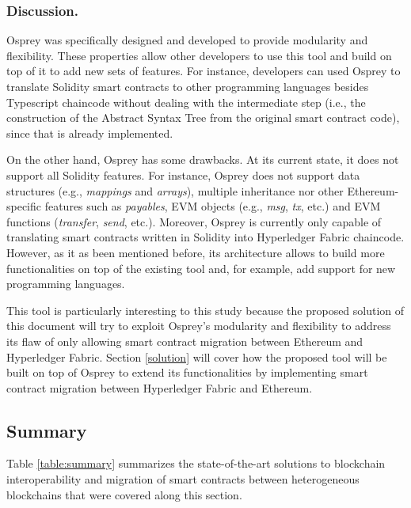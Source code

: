 \documentclass[runningheads]{llncs}
\begin{document}

\subsubsection{Discussion.}
Osprey was specifically designed and developed to provide modularity and flexibility. These properties allow other developers to use this tool and build on top of it to add new sets of features. For instance, developers can used Osprey to translate Solidity smart contracts to other programming languages besides Typescript chaincode without dealing with the intermediate step (i.e., the construction of the Abstract Syntax Tree from the original smart contract code), since that is already implemented. 

On the other hand, Osprey has some drawbacks. At its current state, it does not support all Solidity features. For instance, Osprey does not support data structures (e.g., \textit{mappings} and \textit{arrays}), multiple inheritance nor other Ethereum-specific features such as \textit{payables}, EVM objects (e.g., \textit{msg}, \textit{tx}, etc.) and EVM functions (\textit{transfer}, \textit{send}, etc.). Moreover, Osprey is currently only capable of translating smart contracts written in Solidity into Hyperledger Fabric chaincode. However, as it as been mentioned before, its architecture allows to build more functionalities on top of the existing tool and, for example, add support for new programming languages.

This tool is particularly interesting to this study because the proposed solution of this document will try to exploit Osprey's modularity and flexibility to address its flaw of only allowing smart contract migration between Ethereum and Hyperledger Fabric. Section \ref{solution} will cover how the proposed tool will be built on top of Osprey to extend its functionalities by implementing smart contract migration between Hyperledger Fabric and Ethereum.


\subsection{Summary}

Table \ref{table:summary} summarizes the state-of-the-art solutions to blockchain interoperability and migration of smart contracts between heterogeneous blockchains that were covered along this section.
\end{document}

